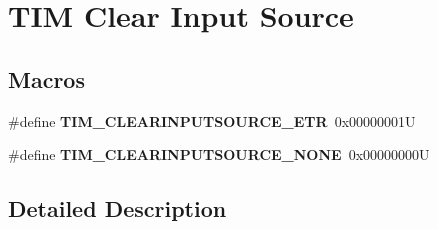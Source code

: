 \hypertarget{group___t_i_m___clear_input___source}{}\section{T\+IM Clear Input Source}
\label{group___t_i_m___clear_input___source}
\subsection*{Macros}
\begin{DoxyCompactItemize}
\item 
\mbox{\label{group___t_i_m___clear_input___source_gaa28a8cf1db85cf6c845c6c1f02ba5c8e}} 
\#define {\bfseries T\+I\+M\+\_\+\+C\+L\+E\+A\+R\+I\+N\+P\+U\+T\+S\+O\+U\+R\+C\+E\+\_\+\+E\+TR}~0x00000001U
\item 
\mbox{\label{group___t_i_m___clear_input___source_ga48c5312aecd377fab00d62e9b4169e9e}} 
\#define {\bfseries T\+I\+M\+\_\+\+C\+L\+E\+A\+R\+I\+N\+P\+U\+T\+S\+O\+U\+R\+C\+E\+\_\+\+N\+O\+NE}~0x00000000U
\end{DoxyCompactItemize}


\subsection{Detailed Description}
